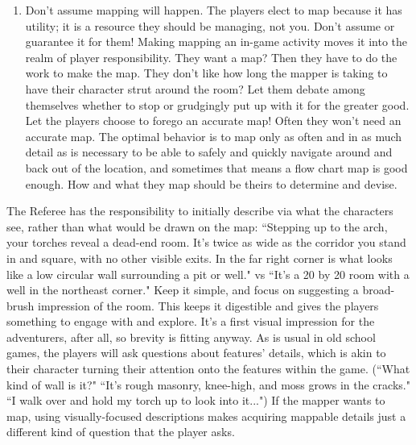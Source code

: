 \documentclass[twoside]{article}
\begin{document}
\begin{enumerate}[nosep]
You'll find that the mapper doesn't try to map rooms on sight anymore; they'll wait until a room is somewhat explored first. You'll find that mapping becomes the answer to ``and what are you doing while those two spend three turns checking the walls for secrets?" and begins to naturally overlap with such activity. You will also find that the mapper acquires the information more organically, making the process more part of the in-game activity itself than dry bookkeeping at the table. All that moving around the room is in-game activity that can interact with the ever-present unknown of a dungeon, which keeps the tension high.
\item Don't assume mapping will happen. The players elect to map because it has utility; it is a resource they should be managing, not you. Don't assume or guarantee it for them! Making mapping an in-game activity moves it into the realm of player responsibility. They want a map? Then they have to do the work to make the map. They don't like how long the mapper is taking to have their character strut around the room? Let them debate among themselves whether to stop or grudgingly put up with it for the greater good. Let the players choose to forego an accurate map! Often they won't need an accurate map. The optimal behavior is to map only as often and in as much detail as is necessary to be able to safely and quickly navigate around and back out of the location, and sometimes that means a flow chart map is good enough. How and what they map should be theirs to determine and devise.
\end{enumerate}

The Referee has the responsibility to initially describe via what the characters see, rather than what would be drawn on the map: ``Stepping up to the arch, your torches reveal a dead-end room. It's twice as wide as the corridor you stand in and square, with no other visible exits. In the far right corner is what looks like a low circular wall surrounding a pit or well." vs ``It's a 20 by 20 room with a well in the northeast corner." Keep it simple, and focus on suggesting a broad-brush impression of the room. This keeps it digestible and gives the players something to engage with and explore. It's a first visual impression for the adventurers, after all, so brevity is fitting anyway. As is usual in old school games, the players will ask questions about features' details, which is akin to their character turning their attention onto the features within the game. (``What kind of wall is it?" ``It's rough masonry, knee-high, and moss grows in the cracks." ``I walk over and hold my torch up to look into it...") If the mapper wants to map, using visually-focused descriptions makes acquiring mappable details just a different kind of question that the player asks.
\end{document}

